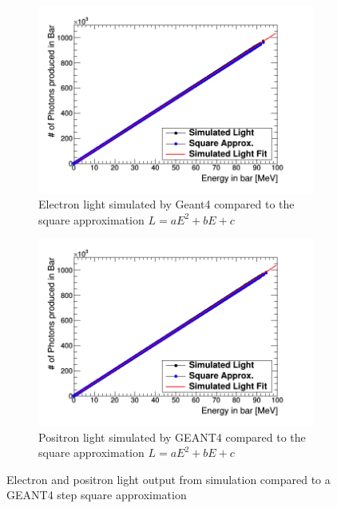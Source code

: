 \begin{figure}[htbp]
\centering
\begin{subfigure}{.5\textwidth}
  \centering
  \includegraphics[width=\linewidth]{light_of_electronsLin0-100mev.png}
  \captionsetup{width=.9\linewidth}
  \caption{Electron light simulated by Geant4 compared to the square approximation $L = aE^2 + bE+ c$ }
  \label{subFig:square_electron_light}
\end{subfigure}%
\begin{subfigure}{.5\textwidth}
  \centering
  \includegraphics[width=\linewidth]{light_of_positronsLin0-100mev.png}
  \captionsetup{width=.9\linewidth}
  \caption{Positron light simulated by GEANT4 compared to the square approximation $L = aE^2 + bE+ c$}
  \label{subFig:square_positron_light}
\end{subfigure}
\caption{Electron and positron light output from simulation compared to a GEANT4 step square approximation}
\label{fig:square_electron_positron_light}
\end{figure}
